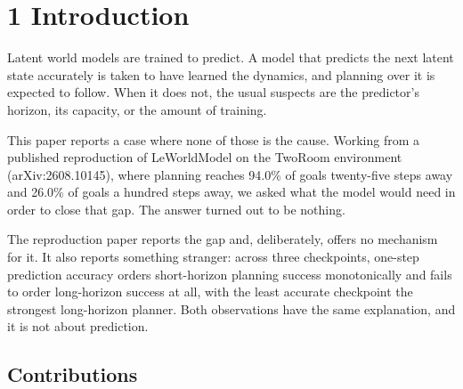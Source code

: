 \documentclass[10pt]{article}
\newcounter{none}
\begin{document}
\section{1 Introduction}\label{introduction}

Latent world models are trained to predict. A model that predicts the next
latent state accurately is taken to have learned the dynamics, and planning
over it is expected to follow. When it does not, the usual suspects are the
predictor's horizon, its capacity, or the amount of training.

This paper reports a case where none of those is the cause. Working from a
published reproduction of LeWorldModel on the TwoRoom environment
(arXiv:2608.10145), where planning reaches 94.0\% of goals twenty-five steps
away and 26.0\% of goals a hundred steps away, we asked what the model would
need in order to close that gap. The answer turned out to be nothing.

The reproduction paper reports the gap and, deliberately, offers no mechanism
for it. It also reports something stranger: across three checkpoints, one-step
prediction accuracy orders short-horizon planning success monotonically and
fails to order long-horizon success at all, with the least accurate checkpoint
the strongest long-horizon planner. Both observations have the same
explanation, and it is not about prediction.

\subsection{Contributions}\label{contributions}
\end{document}
